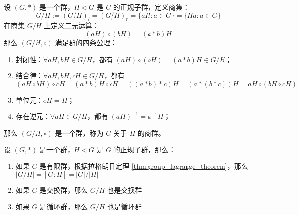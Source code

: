 \begin{definition}
    设 $(G, *)$ 是一个群，$H \triangleleft G$ 是 $G$ 的正规子群，定义商集：
    \[
        G/H:= (G/H)_l = (G/H)_r = \{aH:a\in G\} = \{Ha:a\in G\}
    \]
    在商集 $G/H$ 上定义二元运算：
    \[
        (aH) \circ (bH) = (a * b)H
    \]
    那么 $(G/H, \circ)$ 满足群的四条公理：
    \begin{enumerate}
        \item 封闭性：$\forall aH, bH\in G/H$，都有 $(aH) \circ (bH) = (a * b)H \in G/H$；
        \item 结合律：$\forall aH, bH, cH\in G/H$，都有
        \[
            (aH \circ bH) \circ cH = (a * b)H \circ cH = ((a * b) * c)H = (a * (b * c))H = aH \circ (bH \circ cH)
        \]
        \item 单位元：$eH = H$；
        \item 存在逆元：$\forall aH\in G/H$，都有 $(aH)^{-1} = a^{-1}H$；
    \end{enumerate}
    那么 $(G/H, \circ)$ 是一个群，称为 $G$ 关于 $H$ 的商群。
\end{definition}

\begin{proposition}[商群的性质]
    设 $(G, *)$ 是一个群，$H \triangleleft G$ 是 $G$ 的正规子群，那么：
    \begin{enumerate}
        \item 如果 $G$ 是有限群，根据拉格朗日定理 \ref{thm:group_lagrange_theorem}，那么 $|G/H| = [G:H] = |G|/|H|$
        \item 如果 $G$ 是交换群，那么 $G/H$ 也是交换群
        \item 如果 $G$ 是循环群，那么 $G/H$ 也是循环群
    \end{enumerate}
\end{proposition}


